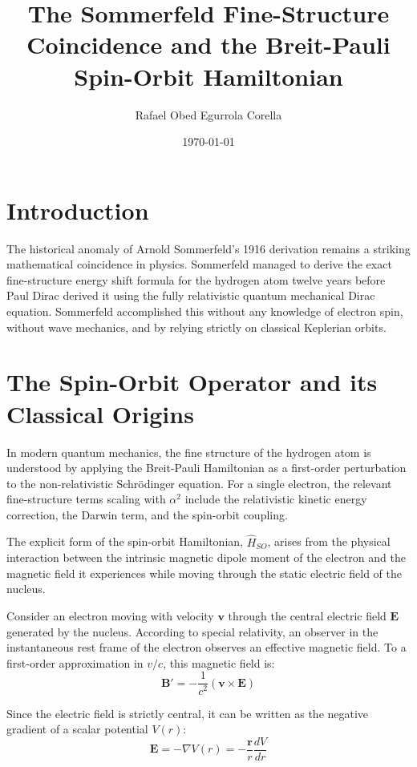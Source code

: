 \documentclass[12pt]{article}
\title{The Sommerfeld Fine-Structure Coincidence and the Breit-Pauli Spin-Orbit Hamiltonian}
\author{Rafael Obed Egurrola Corella}
\date{\today}
\begin{document}
\maketitle

\section{Introduction}
The historical anomaly of Arnold Sommerfeld's 1916 derivation remains a striking mathematical coincidence in physics. Sommerfeld managed to derive the exact fine-structure energy shift formula for the hydrogen atom twelve years before Paul Dirac derived it using the fully relativistic quantum mechanical Dirac equation. Sommerfeld accomplished this without any knowledge of electron spin, without wave mechanics, and by relying strictly on classical Keplerian orbits. 

\section{The Spin-Orbit Operator and its Classical Origins}
In modern quantum mechanics, the fine structure of the hydrogen atom is understood by applying the Breit-Pauli Hamiltonian as a first-order perturbation to the non-relativistic Schr\"odinger equation. For a single electron, the relevant fine-structure terms scaling with $\alpha^2$ include the relativistic kinetic energy correction, the Darwin term, and the spin-orbit coupling.

The explicit form of the spin-orbit Hamiltonian, $\hat{H}_{SO}$, arises from the physical interaction between the intrinsic magnetic dipole moment of the electron and the magnetic field it experiences while moving through the static electric field of the nucleus. 

Consider an electron moving with velocity $\mathbf{v}$ through the central electric field $\mathbf{E}$ generated by the nucleus. According to special relativity, an observer in the instantaneous rest frame of the electron observes an effective magnetic field. To a first-order approximation in $v/c$, this magnetic field is:
\begin{equation}
    \mathbf{B}' = -\frac{1}{c^2} (\mathbf{v} \times \mathbf{E})
\end{equation}

Since the electric field is strictly central, it can be written as the negative gradient of a scalar potential $V(r)$:
\begin{equation}
    \mathbf{E} = -\nabla V(r) = -\frac{\mathbf{r}}{r} \frac{dV}{dr}
\end{equation}
\end{document}
